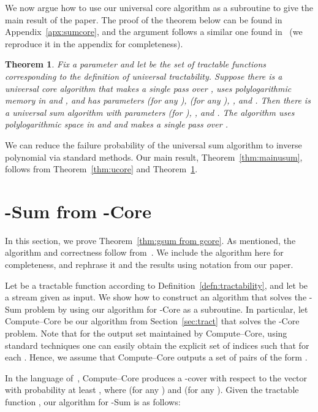 \documentclass[11pt]{article}
\newtheorem{thm}{Theorem}
\begin{document}
We now argue how to use our universal core algorithm  as a subroutine to give the main result
of the paper.  The proof of the theorem below can be found in Appendix~\ref{apx:sumcore}, and the argument
follows a similar one found in~\cite{BO13} (we reproduce it in the appendix for completeness).

\begin{thm}\label{thm:usum}
Fix a parameter  and let  be the set of tractable functions corresponding to the
definition of universal tractability.  Suppose there is a universal core algorithm that makes a single pass over
, uses polylogarithmic memory in  and , and has parameters
 (for any ), 
(for any ), , and .  Then
there is a universal sum algorithm with parameters
 (for ), ,
and .  The algorithm uses polylogarithmic space in  and  and makes a single
pass over .
\end{thm}

\noindent We can reduce the failure probability of the universal sum algorithm to
inverse polynomial via standard methods.  Our main result, Theorem~\ref{thm:mainusum},
follows from Theorem~\ref{thm:ucore} and Theorem~\ref{thm:usum}.




\appendix


\section{-Sum from -Core}\label{apx:sum}
In this section, we prove Theorem~\ref{thm:gsum from gcore}.
As mentioned, the algorithm and correctness follow from~\cite{BO13}.  We include the algorithm
here for completeness, and rephrase it and the results using notation from our paper.

Let  be a tractable function according to Definition~\ref{defn:tractability}, and let  be a stream given as input.
We show how to construct an algorithm that solves the -Sum problem by using our algorithm for -Core as
a subroutine.  In particular, let Compute--Core be our algorithm from Section~\ref{sec:tract} that solves
the -Core problem.  Note that for the output set 
 maintained by Compute--Core, using standard techniques one can easily obtain the explicit set
of indices  such that 
for each .  Hence, we assume that Compute--Core outputs a set of pairs of the form
.

In the language of~\cite{BO13}, Compute--Core produces a -cover with respect to the
vector  with probability at least , where 
(for any ) and  (for any ).  Given the tractable function
, our algorithm for -Sum is as follows:
\end{document}
